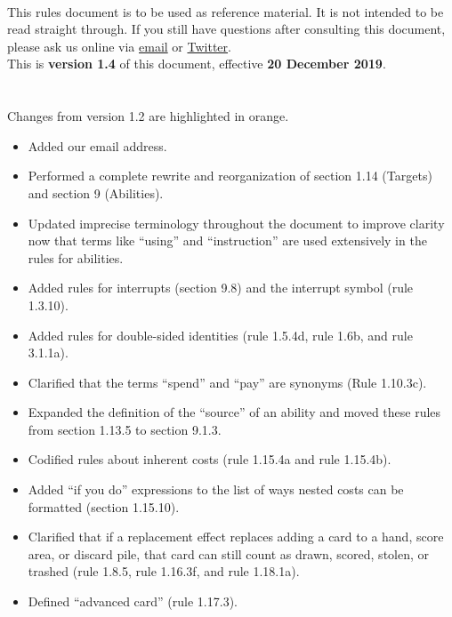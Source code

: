 \newcommand{\HRule}{\rule{\linewidth}{0.2mm}} %

\begin{titlepage}
\\[10pt]
This rules document is to be used as reference material. It is not intended to be read straight through. If you still have questions after consulting this document, please ask us online via \href{mailto:rules@nisei.net}{email} or \href{https://twitter.com/NISEI_Rules}{Twitter}.\\[10pt]
This is \textbf{version 1.4} of this document, effective \textbf{20 December 2019}.\\\\
\\[10pt]
Changes from version 1.2 are \textcolor{Bittersweet}{highlighted in orange}.
\begin{itemize}
	\item Added our email address.
	\item Performed a complete rewrite and reorganization of section 1.14 (Targets) and section 9 (Abilities).
	\item Updated imprecise terminology throughout the document to improve clarity now that terms like ``using'' and ``instruction'' are used extensively in the rules for abilities.
	\item Added rules for interrupts (section 9.8) and the interrupt symbol (rule 1.3.10).
	\item Added rules for double-sided identities (rule 1.5.4d, rule 1.6b, and rule 3.1.1a).
	\item Clarified that the terms ``spend'' and ``pay'' are synonyms (Rule 1.10.3c).
	\item Expanded the definition of the ``source'' of an ability and moved these rules from section 1.13.5 to section 9.1.3.
	\item Codified rules about inherent costs (rule 1.15.4a and rule 1.15.4b).
	\item Added “if you do'' expressions to the list of ways nested costs can be formatted (section 1.15.10).
	\item Clarified that if a replacement effect replaces adding a card to a hand, score area, or discard pile, that card can still count as drawn, scored, stolen, or trashed (rule 1.8.5, rule 1.16.3f, and rule 1.18.1a).
	\item Defined ``advanced card'' (rule 1.17.3).

\end{itemize}
\end{titlepage}
